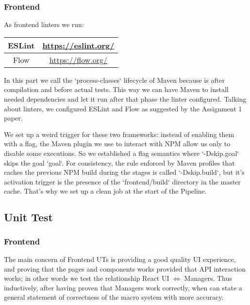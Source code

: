 \documentclass[a4paper,10pt]{scrartcl}
\begin{document}
\subsubsection{Frontend}

As frontend linters we run:
\begin{center}
    \begin{tabular}{|c|c|}
        \hline
        ESLint & \href{https://eslint.org/}{https://eslint.org/} \\
        \hline
        Flow & \href{https://flow.org/}{https://flow.org/} \\
        \hline
    \end{tabular}
\end{center}

In this part we call the `process-classes` lifecycle of Maven because is after compilation and before actual tests. This way we can have Maven to install needed dependencies and let it run after that phase the linter configured. Talking about linters, we configured ESLint and Flow as suggested by the Assignment 1 paper.

We set up a weird trigger for these two frameworks: instead of enabling them with a flag, the Maven plugin we use to interact with NPM allow us only to disable some executions. So we established a flag semantics where `-Dskip.{goal}` skips the goal `goal`. For consistency, the rule enforced by Maven profiles that caches the previous NPM build during the stages is called `-Dskip.build`, but it's activation trigger is the presence of the `frontend/build` directory in the master cache. That's why we set up a clean job at the start of the Pipeline.

\subsection{Unit Test}

\subsubsection{Frontend}

The main concern of Frontend UTs is providing a good quality UI experience, and proving that the pages and components works provided that API interaction works; in other words we test the relationship React UI $\Leftrightarrow$ Managers. Thus inductively, after having proven that Managers work correctly, when can state a general statement of correctness of the macro system with more accuracy.
\end{document}
